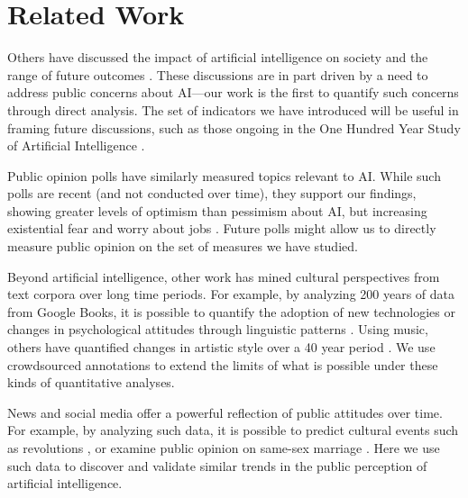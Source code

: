 \documentclass[letterpaper]{article}
\begin{document}
\section{Related Work}

Others have discussed the impact of artificial intelligence on society and the range of future outcomes \cite{ai-concerns}. These discussions are in part driven by a need to address public concerns about AI---our work is the first to quantify such concerns through direct analysis. The set of indicators we have introduced will be useful in framing future discussions, such as those ongoing in the One Hundred Year Study of Artificial Intelligence \cite{100years}.  

Public opinion polls have similarly measured topics relevant to AI. While such polls are recent (and not conducted over time), they support our findings, showing greater levels of optimism than pessimism about AI, but increasing existential fear and worry about jobs \cite{bsa-poll,cbs-poll}. Future polls might allow us to directly measure public opinion on the set of measures we have studied. 

Beyond artificial intelligence, other work has mined cultural perspectives from text corpora over long time periods. For example, by analyzing 200 years of data from Google Books, it is possible to quantify the adoption of new technologies or changes in psychological attitudes through linguistic patterns \cite{google-culture,psych-culture}. Using music, others have quantified changes in artistic style over a 40 year period \cite{music-over-time}. We use crowdsourced annotations to extend the limits of what is possible under these kinds of quantitative analyses.


News and social media offer a powerful reflection of public attitudes over time. For example, by analyzing such data, it is possible to predict cultural events such as revolutions \cite{future1,future2}, or examine public opinion on same-sex marriage \cite{marriage}. Here we use such data to discover and validate similar trends in the public perception of artificial intelligence. 
\end{document}
